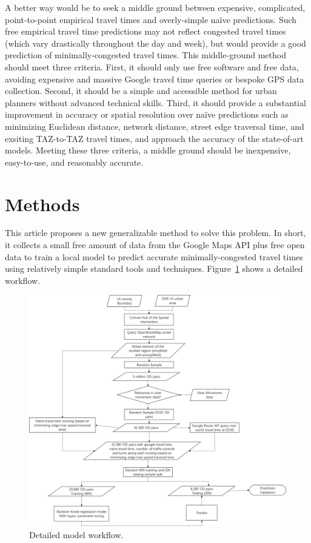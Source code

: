 \documentclass[12pt,letterpaper]{article} %
\begin{document}
A better way would be to seek a middle ground between expensive, complicated, point-to-point empirical travel times and overly-simple naïve predictions. Such free empirical travel time predictions may not reflect congested travel times (which vary drastically throughout the day and week), but would provide a good prediction of minimally-congested travel times. This middle-ground method should meet three criteria. First, it should only use free software and free data, avoiding expensive and massive Google travel time queries or bespoke GPS data collection. Second, it should be a simple and accessible method for urban planners without advanced technical skills. Third, it should provide a substantial improvement in accuracy or spatial resolution over naïve predictions such as minimizing Euclidean distance, network distance, street edge traversal time, and exsiting TAZ-to-TAZ travel times, and approach the accuracy of the state-of-art models. Meeting these three criteria, a middle ground should be inexpensive, easy-to-use, and reasonably accurate.

\section{Methods}

This article proposes a new generalizable method to solve this problem. In short, it collects a small free amount of data from the Google Maps API plus free open data to train a local model to predict accurate minimally-congested travel times using relatively simple standard tools and techniques. Figure~\ref{fig:workflow} shows a detailed workflow.

\begin{figure}[hbt!]
    \centering
    \includegraphics[width=1.0\textwidth]{fig_workflow.jpg}
    \caption{Detailed model workflow.}\label{fig:workflow}
\end{figure}
\end{document}
